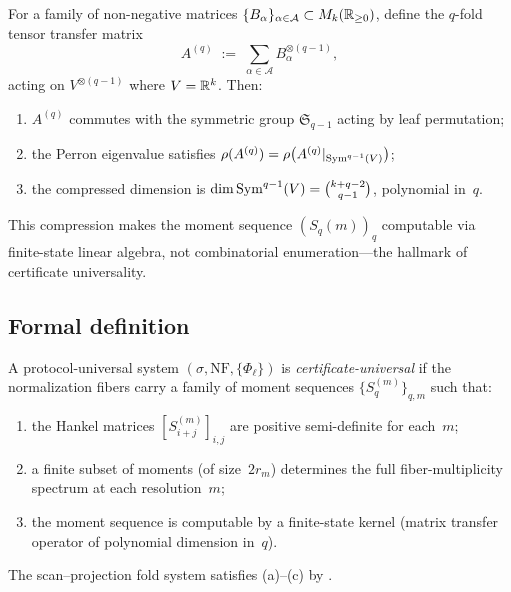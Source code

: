 \begin{theorem}
\label{thm:star-kernel}
For a family of non-negative matrices
$\{B_{\alpha}\}_{\alpha \in \mathcal{A}} \subset M_{k}(\mathbb{R}_{\ge 0})$,
define the $q$-fold tensor transfer matrix
\[
  A^{(q)}
    \;:=\; \sum_{\alpha \in \mathcal{A}}
      B_{\alpha}^{\otimes(q-1)},
\]
acting on $V^{\otimes(q-1)}$ where $V = \mathbb{R}^{k}$.  Then:
\begin{enumerate}[label=(\roman*)]
\item $A^{(q)}$ commutes with the symmetric group
  $\mathfrak{S}_{q-1}$ acting by leaf permutation;
\item the Perron eigenvalue satisfies
  $\rho(A^{(q)}) = \rho\bigl(A^{(q)}|_{\operatorname{Sym}^{q-1}(V)}\bigr)$;
\item the compressed dimension is
  $\dim \operatorname{Sym}^{q-1}(V) = \binom{k+q-2}{q-1}$, polynomial in~$q$.
\end{enumerate}
\end{theorem}

This compression makes the moment sequence
$(S_{q}(m))_{q}$ computable via finite-state linear algebra, not
combinatorial enumeration---the hallmark of certificate
universality.

\subsection{Formal definition}

\begin{definition}
\label{def:cert-univ}
A protocol-universal system $(\sigma, \mathrm{NF},
\{\Phi_{\ell}\})$ is \emph{certificate-universal} if the
normalization fibers carry a family of moment sequences
$\{S_{q}^{(m)}\}_{q,m}$ such that:
\begin{enumerate}[label=(\alph*)]
\item the Hankel matrices
  $[S_{i+j}^{(m)}]_{i,j}$ are positive semi-definite
  for each~$m$;
\item a finite subset of moments (of size~$2r_{m}$) determines
  the full fiber-multiplicity spectrum at each resolution~$m$;
\item the moment sequence is computable by a finite-state kernel
  (matrix transfer operator of polynomial dimension in~$q$).
\end{enumerate}
\end{definition}

The scan--projection fold system satisfies (a)--(c) by
.
